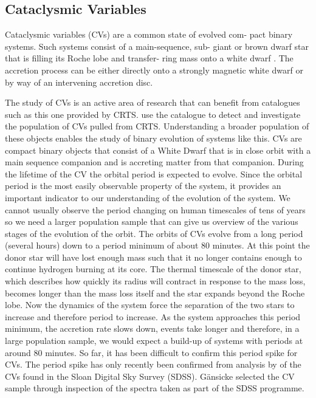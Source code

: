 \documentclass[a4paper,fleqn,usenatbib]{mnras}
\begin{document}
\subsection{Cataclysmic Variables}
Cataclysmic variables (CVs) are a common state of evolved com- pact binary systems. Such systems consist of a main-sequence, sub- giant or brown dwarf star that is filling its Roche lobe and transfer- ring mass onto a white dwarf \citep{WarnerBook}. The accretion process can be either directly onto a strongly magnetic white dwarf or by way of an intervening accretion disc. 

The study of CVs is an active area of research that can benefit from catalogues such as this one provided by CRTS. \citet{Breedt2014} use the catalogue to detect and investigate the population of CVs pulled from CRTS. Understanding a broader population of these objects enables the study of binary evolution of systems like this. CVs are compact binary objects that consist of a White Dwarf that is in close orbit with a main sequence companion and is accreting matter from that companion. During the lifetime of the CV the orbital period is expected to evolve. Since the orbital period is the most easily observable property of the system, it provides an important indicator to our understanding of the evolution of the system. We cannot usually observe the period changing on human timescales of tens of years so we need a larger population sample that can give us overview of the various stages of the evolution of the orbit. The orbits of CVs evolve from a long period (several hours) down to a period minimum of about 80 minutes. At this point the donor star will have lost enough mass such that it no longer contains enough to continue hydrogen burning at its core. The thermal timescale of the donor star, which describes how quickly its radius will contract in response to the mass loss, becomes longer than the mass loss itself and the star expands beyond the Roche lobe. Now the dynamics of the system force the separation of the two stars to increase and therefore period to increase. As the system approaches this period minimum, the accretion rate slows down, events take longer and therefore, in a large population sample, we would expect a build-up of systems with periods at around 80 minutes. So far, it has been difficult to confirm this period spike for CVs.  The period spike has only recently been confirmed from analysis by \citet{Gaensicke2009} of the CVs found in the Sloan Digital Sky Survey (SDSS).  G{\"a}nsicke selected the CV sample through inspection of the spectra taken as part of the SDSS programme. 
\end{document}
